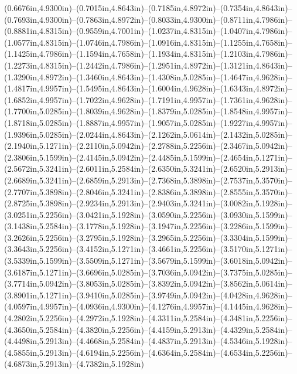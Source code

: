 (0.6676in,4.9300in)--(0.7015in,4.8643in)--(0.7185in,4.8972in)--(0.7354in,4.8643in)--(0.7693in,4.9300in)--(0.7863in,4.8972in)--(0.8033in,4.9300in)--(0.8711in,4.7986in)--(0.8881in,4.8315in)--(0.9559in,4.7001in)--(1.0237in,4.8315in)--(1.0407in,4.7986in)--(1.0577in,4.8315in)--(1.0746in,4.7986in)--(1.0916in,4.8315in)--(1.1255in,4.7658in)--(1.1425in,4.7986in)--(1.1594in,4.7658in)--(1.1934in,4.8315in)--(1.2103in,4.7986in)--(1.2273in,4.8315in)--(1.2442in,4.7986in)--(1.2951in,4.8972in)--(1.3121in,4.8643in)--(1.3290in,4.8972in)--(1.3460in,4.8643in)--(1.4308in,5.0285in)--(1.4647in,4.9628in)--(1.4817in,4.9957in)--(1.5495in,4.8643in)--(1.6004in,4.9628in)--(1.6343in,4.8972in)--(1.6852in,4.9957in)--(1.7022in,4.9628in)--(1.7191in,4.9957in)--(1.7361in,4.9628in)--(1.7700in,5.0285in)--(1.8039in,4.9628in)--(1.8379in,5.0285in)--(1.8548in,4.9957in)--(1.8718in,5.0285in)--(1.8887in,4.9957in)--(1.9057in,5.0285in)--(1.9227in,4.9957in)--(1.9396in,5.0285in)--(2.0244in,4.8643in)--(2.1262in,5.0614in)--(2.1432in,5.0285in)--(2.1940in,5.1271in)--(2.2110in,5.0942in)--(2.2788in,5.2256in)--(2.3467in,5.0942in)--(2.3806in,5.1599in)--(2.4145in,5.0942in)--(2.4485in,5.1599in)--(2.4654in,5.1271in)--(2.5672in,5.3241in)--(2.6011in,5.2584in)--(2.6350in,5.3241in)--(2.6520in,5.2913in)--(2.6689in,5.3241in)--(2.6859in,5.2913in)--(2.7368in,5.3898in)--(2.7537in,5.3570in)--(2.7707in,5.3898in)--(2.8046in,5.3241in)--(2.8386in,5.3898in)--(2.8555in,5.3570in)--(2.8725in,5.3898in)--(2.9234in,5.2913in)--(2.9403in,5.3241in)--(3.0082in,5.1928in)--(3.0251in,5.2256in)--(3.0421in,5.1928in)--(3.0590in,5.2256in)--(3.0930in,5.1599in)--(3.1438in,5.2584in)--(3.1778in,5.1928in)--(3.1947in,5.2256in)--(3.2286in,5.1599in)--(3.2626in,5.2256in)--(3.2795in,5.1928in)--(3.2965in,5.2256in)--(3.3304in,5.1599in)--(3.3643in,5.2256in)--(3.4152in,5.1271in)--(3.4661in,5.2256in)--(3.5170in,5.1271in)--(3.5339in,5.1599in)--(3.5509in,5.1271in)--(3.5679in,5.1599in)--(3.6018in,5.0942in)--(3.6187in,5.1271in)--(3.6696in,5.0285in)--(3.7036in,5.0942in)--(3.7375in,5.0285in)--(3.7714in,5.0942in)--(3.8053in,5.0285in)--(3.8392in,5.0942in)--(3.8562in,5.0614in)--(3.8901in,5.1271in)--(3.9410in,5.0285in)--(3.9749in,5.0942in)--(4.0428in,4.9628in)--(4.0597in,4.9957in)--(4.0936in,4.9300in)--(4.1276in,4.9957in)--(4.1445in,4.9628in)--(4.2802in,5.2256in)--(4.2972in,5.1928in)--(4.3311in,5.2584in)--(4.3481in,5.2256in)--(4.3650in,5.2584in)--(4.3820in,5.2256in)--(4.4159in,5.2913in)--(4.4329in,5.2584in)--(4.4498in,5.2913in)--(4.4668in,5.2584in)--(4.4837in,5.2913in)--(4.5346in,5.1928in)--(4.5855in,5.2913in)--(4.6194in,5.2256in)--(4.6364in,5.2584in)--(4.6534in,5.2256in)--(4.6873in,5.2913in)--(4.7382in,5.1928in)
